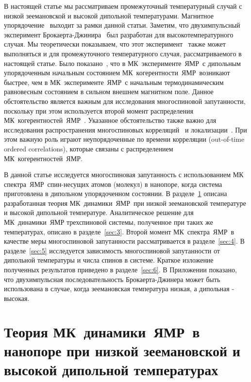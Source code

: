 \documentclass[utf8]{jetp}
\begin{document}
В настоящей статье мы рассматриваем промежуточный температурный случай с низкой зеемановской и высокой дипольной температурами.
Магнитное упорядочение~\cite{Abragam_1982} выходит за рамки данной статьи.
Заметим, что двухимпульсный эксперимент Брокаерта-Джинира~\cite{Jeener_1967} был разработан для высокотемпературного случая.
Мы теоретически  показываем, что этот эксперимент~\cite{Jeener_1967} также может выполняться и для промежуточного температурного случая, рассматриваемого в настоящей статье.
Было показано~\cite{Doronin_2011}, что в МК~эксперименте~ЯМР~с дипольным упорядоченным начальным состоянием МК~когерентности~ЯМР~возникают быстрее,
чем в МК~эксперименте~ЯМР~с начальным термодинамическим равновесным состоянием в сильном внешнем магнитном поле.
Данное обстоятельство является важным для исследования многоспиновой запутанности, поскольку при этом используется  второй момент распределения МК~когерентностей~ЯМР~.
Указанное обстоятельство также важно для исследования распространения многоспиновых корреляций~\cite{Baugh_2001,Baum_1986,S_nchez_2014,Munowitz_1987} и локализации~\cite{Alvarez_2015,Wei_2018}.
При этом важную роль играют неупорядоченные по времени корреляции (out-of-time ordered correlations), которые связаны с распределением МК~когерентностей~ЯМР.

В данной статье исследуется многоспиновая запутанность с использованием МК  спектра~ЯМР~спин-несущих атомов (молекул) в нанопоре, когда система приготовлена в дипольном упорядоченном состоянии.
В разделе~\ref{sec:2} описана разработанная теория МК~динамики~ЯМР~при низкой зеемановской температуре и высокой дипольной температуре.
Аналитическое решение для МК~динамики~ЯМР трехспиновой системы, полученное при таких же температурах,  описано в разделе~\ref{sec:3}.
Второй момент МК~спектра~ЯМР~в качестве меры многоспиновой запутанности рассматривается в разделе~\ref{sec:4}.
В разделе~\ref{sec:5} исследуется зависимость многоспиновой запутанности от дипольной температуры и числа спинов в системе.
Краткое изложение полученных результатов приведено в разделе~\ref{sec:6}.
В Приложении показано, что двухимпульсная последовательность Брокаерта-Джинера может быть использована в случае, когда зеемановская температура низкая, а дипольная - высокая.



\section{Теория МК~динамики~ЯМР~в нанопоре при низкой зеемановской  и высокой дипольной температурах}
\label{sec:2}
\end{document}
